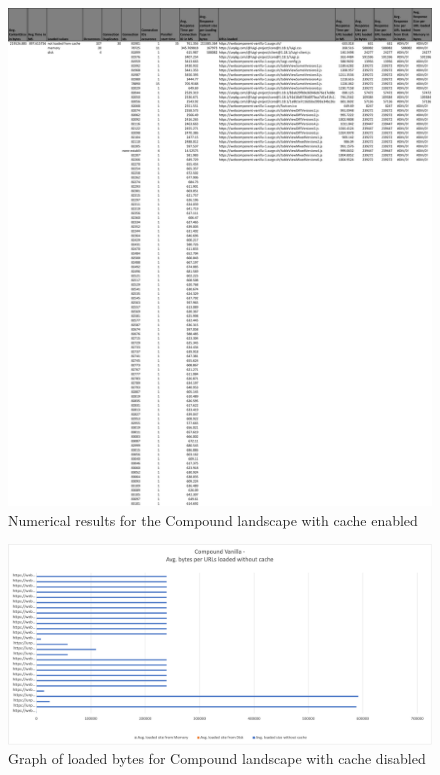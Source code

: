 \begin{figure}[!h]
	\centering
	\begin{adjustbox}{width=\textwidth,totalheight=0.9\textheight}
		\includegraphics[angle=90]{Figures/compound_allhar_cache.pdf}
	\end{adjustbox}
	\caption{Numerical results for the Compound landscape with cache enabled}
	\label{fig:appendix_1_22}
\end{figure}
\newpage
\begin{figure}[!h]
	\centering
	\includegraphics[width=1.4\textwidth, angle=90]{Figures/compound_bytes.png}
	\caption{Graph of loaded bytes for Compound landscape with cache disabled}
	\label{fig:appendix_1_23}
\end{figure}
